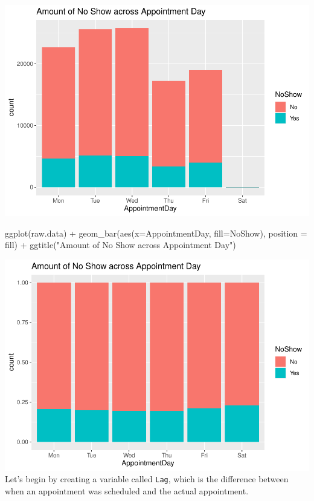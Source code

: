 \documentclass[
]{article}
\newenvironment{Shaded}{\begin{snugshade}}{\end{snugshade}}
\newcommand{\AttributeTok}[1]{\textcolor[rgb]{0.77,0.63,0.00}{#1}}
\newcommand{\FunctionTok}[1]{\textcolor[rgb]{0.00,0.00,0.00}{#1}}
\newcommand{\NormalTok}[1]{#1}
\newcommand{\SpecialCharTok}[1]{\textcolor[rgb]{0.00,0.00,0.00}{#1}}
\newcommand{\StringTok}[1]{\textcolor[rgb]{0.31,0.60,0.02}{#1}}
\begin{document}
\includegraphics{lab1_medical_databases_files/figure-latex/unnamed-chunk-14-1.pdf}

\begin{Shaded}
\begin{Highlighting}[]
\FunctionTok{ggplot}\NormalTok{(raw.data) }\SpecialCharTok{+}
  \FunctionTok{geom\_bar}\NormalTok{(}\FunctionTok{aes}\NormalTok{(}\AttributeTok{x=}\NormalTok{AppointmentDay, }\AttributeTok{fill=}\NormalTok{NoShow), }\AttributeTok{position =} \StringTok{\textquotesingle{}fill\textquotesingle{}}\NormalTok{) }\SpecialCharTok{+}
  \FunctionTok{ggtitle}\NormalTok{(}\StringTok{"Amount of No Show across Appointment Day"}\NormalTok{) }
\end{Highlighting}
\end{Shaded}

\includegraphics{lab1_medical_databases_files/figure-latex/unnamed-chunk-14-2.pdf}
Let's begin by creating a variable called \texttt{Lag}, which is the
difference between when an appointment was scheduled and the actual
appointment.
\end{document}
